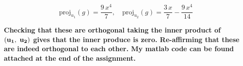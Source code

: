 \vspace{-0.35in}
\begin{equation*}
    \boxed{\text{proj}_{u_1}(g) =  \frac{9\,x^4}{7},\quad \text{proj}_{u_2}(g) = \frac{3\,x}{7}-\frac{9\,x^4}{14} }
\end{equation*}

\begin{fminipage}{0.8\linewidth}
    \textbf{Checking that these are orthogonal taking the inner product of $\bf (u_1,\ u_2)$ gives that the inner produce is zero. Re-affirming that these are indeed orthogonal to each other. My matlab code can be found attached at the end of the assignment.}
\end{fminipage}